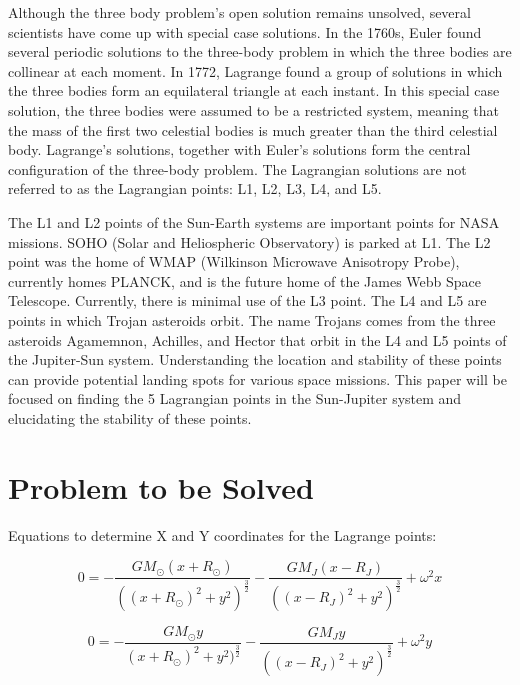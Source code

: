 \documentclass[linenumbers,RNAAS,trackchanges]{aastex631}
\begin{document}
Although the three body problem's open solution remains unsolved, several scientists have come up with special case solutions. In the 1760s, Euler found several periodic solutions to the three-body problem in which the three bodies are collinear at each moment. In 1772, Lagrange found a group of solutions in which the three bodies form an equilateral triangle at each instant. In this special case solution, the three bodies were assumed to be a restricted system, meaning that the mass of the first two celestial bodies is much greater than the third celestial body. Lagrange’s solutions, together with Euler’s solutions form the central configuration of the three-body problem. The Lagrangian solutions are not referred to as the Lagrangian points: L1, L2, L3, L4, and L5.\cite{unknown}


The L1 and L2 points of the Sun-Earth systems are important points for NASA missions. SOHO (Solar and Heliospheric Observatory) is parked at L1. The L2 point was the home of WMAP (Wilkinson Microwave Anisotropy Probe), currently homes PLANCK, and is the future home of the James Webb Space Telescope. Currently, there is minimal use of the L3 point. The L4 and L5 are points in which Trojan asteroids orbit. The name Trojans comes from the three  asteroids Agamemnon, Achilles, and Hector that orbit in the L4 and L5 points of the Jupiter-Sun system. Understanding the location and stability of these points can provide potential landing spots for various space missions. This paper will be focused on finding the 5 Lagrangian points in the Sun-Jupiter system and elucidating the stability of these points.\cite{unknown}
 



\newpage
\section{Problem to be Solved} \label{sec:problem}
\begin{center}Equations to determine X and Y coordinates for the Lagrange points:\end{center}
\begin{equation}
\label{eqn:"Eq. 1"}
0 = -\frac{GM_\odot(x + R_\odot)}{((x + R_\odot)^2 + y^2)^\frac{3}{2}} - \frac{GM_J(x - R_{J})}{((x - R_{J})^2 + y^2)^\frac{3}{2}} + \omega^2x 
\end{equation}

\begin{equation}
\label{eqn:"Eq. 2"}
0 = -\frac{GM_\odot y}{(x + R_\odot)^2 + y^2)^\frac{3}{2}} - \frac{GM_{J} y}{((x - R_{J} )^2 + y^2)^\frac{3}{2}} + \omega^2y
\end{equation}
\end{document}
